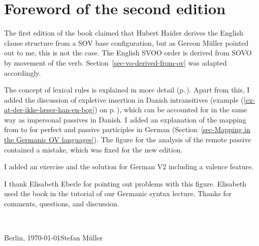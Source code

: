 \section*{Foreword of the second edition}



The first edition of the book claimed that Hubert Haider derives the English clause structure from a
SOV base configuration, but as Gereon Müller pointed out to me, this is not the case. The English
SVOO order is derived from SOVO by movement of the verb. Section~\ref{sec-vo-derived-from-ov} was
adapted accordingly.

The concept of lexical rules is explained in more detail (p.\,\pageref{page-lexical-rule-explanation-start}).%
Apart from this, I added the discussion of expletive insertion in Danish intransitives (example (\ref{ex-at-der-ikke-læser-han-en-bog}) on
p.\,\pageref{ex-at-der-ikke-læser-han-en-bog}), which can be accounted for in the same way as
impersonal passives in Danish. I added an explanation of the mapping from \argst to \comps for
perfect and passive participles in German (Section~\ref{sec-Mapping in the Germanic OV
  languages}). The figure for the analysis of the remote passive contained a mistake, which was
fixed for the new edition. 

I added an exercise and the solution for German V2 including a valence feature.

I thank Elisabeth Eberle for pointing out problems with this figure. Elisabeth used the book in the tutorial of our
Germanic syntax lecture. Thanks for comments, questions, and discussion.

~\medskip

\noindent
Berlin, \today\hfill Stefan Müller

